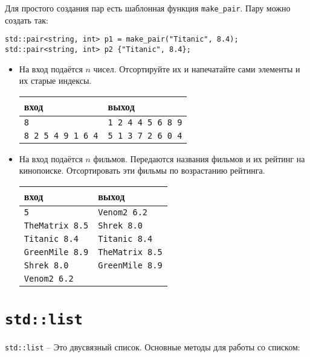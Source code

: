 \documentclass{article}
\begin{document}
Для простого создания пар есть шаблонная функция \texttt{make\_pair}. Пару можно создать так:
\begin{lstlisting}
std::pair<string, int> p1 = make_pair("Titanic", 8.4);
std::pair<string, int> p2 {"Titanic", 8.4};
\end{lstlisting}

\begin{itemize}
\item На вход подаётся $n$ чисел. Отсортируйте их и напечатайте сами элементы и их старые индексы. 
\begin{center}
\begin{tabular}{ l | l }
 вход & выход \\ \hline
 \texttt{8} &                \texttt{1 2 4 4 5 6 8 9}  \\ 
 \texttt{8 2 5 4 9 1 6 4} &  \texttt{5 1 3 7 2 6 0 4}\\
\end{tabular}
\end{center}

\item На вход подаётся $n$ фильмов. Передаются названия фильмов и их рейтинг на кинопоиске. Отсортировать эти фильмы по возрастанию рейтинга.
\begin{center}
\begin{tabular}{ l | l }
 вход & выход \\ \hline
 \texttt{5}              & \texttt{Venom2 6.2}  \\ 
 \texttt{TheMatrix 8.5}  & \texttt{Shrek 8.0}  \\
 \texttt{Titanic 8.4}    & \texttt{Titanic 8.4}\\
 \texttt{GreenMile 8.9}  & \texttt{TheMatrix 8.5}\\
 \texttt{Shrek 8.0}      & \texttt{GreenMile 8.9}\\
 \texttt{Venom2 6.2}     &\\
\end{tabular}
\end{center}
\end{itemize}
\newpage
\section*{\texttt{std::list}}
\texttt{std::list} -- Это двусвязный список. Основные методы для работы со списком:
\end{document}
